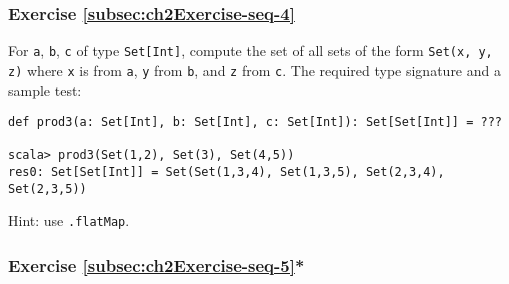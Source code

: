 \subsubsection{Exercise \label{subsec:ch2Exercise-seq-4}\ref{subsec:ch2Exercise-seq-4}}

For \lstinline!a!, \lstinline!b!,
\lstinline!c! of type \lstinline!Set[Int]!,
compute the set of all sets of the form \lstinline!Set(x, y, z)!
where \lstinline!x! is
from \lstinline!a!, \lstinline!y!
from \lstinline!b!, and
\lstinline!z! from \lstinline!c!.
The required type signature and a sample test:
\begin{lstlisting}
def prod3(a: Set[Int], b: Set[Int], c: Set[Int]): Set[Set[Int]] = ???

scala> prod3(Set(1,2), Set(3), Set(4,5))
res0: Set[Set[Int]] = Set(Set(1,3,4), Set(1,3,5), Set(2,3,4), Set(2,3,5))
\end{lstlisting}
Hint: use \lstinline!.flatMap!.%
\begin{comment}
Solution:\inputencoding{latin9}
\begin{lstlisting}
def prod3(a: Set[Int], b: Set[Int], c: Set[Int]): Set[Set[Int]] =     a.flatMap(x => b.flatMap(y => c.map(z => Set(x, y, z))))
\end{lstlisting}
\inputencoding{utf8}\end{comment}


\subsubsection{Exercise \label{subsec:ch2Exercise-seq-5}\ref{subsec:ch2Exercise-seq-5}{*}}

